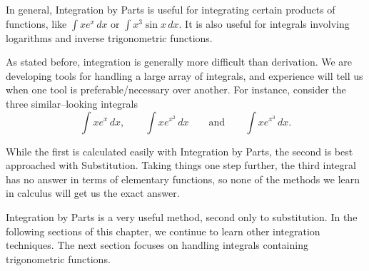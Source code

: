 In general, Integration by Parts is useful for integrating certain products of functions, like $\int x e^x\,dx$ or $\int x^3\sin x\,dx$.   It is also useful for integrals involving logarithms and inverse trigonometric functions.  

As stated before, integration is generally more difficult than derivation. We are developing tools for handling a large array of integrals, and experience will tell us when one tool is preferable/necessary over another. For instance, consider the three similar--looking integrals 
$$\int xe^x\,dx, \qquad  \int x e^{x^2}\,dx \qquad \text{and} \qquad \int xe^{x^3}\,dx.$$

While the first is calculated easily with Integration by Parts, the second is best approached with Substitution.  Taking things one step further, the third integral has no answer in terms of elementary functions, so none of the methods we learn in calculus will get us the exact answer.

Integration by Parts is a very useful method, second only to substitution. In the following sections of this chapter, we continue to learn other integration techniques. The next section focuses on handling integrals containing trigonometric functions.




